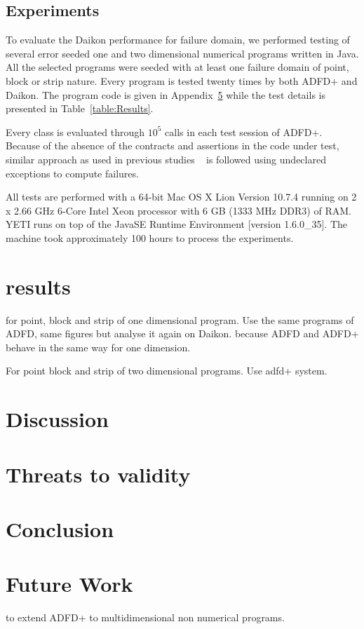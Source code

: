 \subsection{Experiments}
To evaluate the Daikon performance for failure domain, we performed testing of several error seeded one and two dimensional numerical programs written in Java. All the selected programs were seeded with at least one failure domain of point, block or strip nature. Every program is tested twenty times by both ADFD+ and Daikon. The program code is given in Appendix~\ref{} while the test details is presented in Table~\ref{table:Results}.

Every class is evaluated through $10^5$ calls in each test session of ADFD+.
Because of the absence of the contracts and assertions in the code under test, similar approach as used in previous studies ~\cite{Oriol2012} is followed using undeclared exceptions to compute failures.


All tests are performed with a 64-bit Mac OS X Lion Version 10.7.4 running on 2 x 2.66 GHz 6-Core Intel Xeon processor with 6 GB (1333 MHz DDR3) of RAM. YETI runs on top of the Java\texttrademark  SE Runtime Environment [version 1.6.0\_35]. The machine took approximately 100 hours to process the experiments.

\section{results}

for point, block and strip of one dimensional program. Use the same programs of ADFD, same figures but analyse it again on Daikon. because ADFD and ADFD+ behave in the same way for one dimension.

For point block and strip of two dimensional programs. Use adfd+ system.






\section{Discussion}
\section{Threats to validity}




\section{Conclusion}

\section{Future Work}
to extend ADFD+ to multidimensional non numerical programs.
